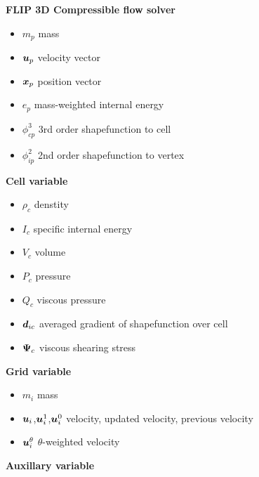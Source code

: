 \documentclass[11pt]{article}
\def\bbf#1{\mathchoice{\hbox{\boldmath$\displaystyle#1$}}
{\hbox{\boldmath$\textstyle#1$}} {\hbox{\boldmath$\scriptstyle#1$}} {\hbox{\boldmath$\scriptscriptstyle#1$}} }
\renewcommand{\mp}{m_{p}}
\newcommand{\pcp}{\phi_{cp}^3}
\newcommand{\pip}{\phi_{ip}^2}
\newcommand{\ui}{\bbf{u}_i}
\newcommand{\uiz}{\bbf{u}_i^{0}}
\newcommand{\uio}{\bbf{u}_i^{1}}
\newcommand{\uit}{\bbf{u}_i^{\theta}}
\newcommand{\up}{\bbf{u}_p}
\newcommand{\xp}{\bbf{x}_p}
\newcommand{\ep}{e_p}
\newcommand{\mi}{m_i}
\renewcommand{\mp}{m_p}
\newcommand{\rhoc}{\rho_c}
\newcommand{\Vc}{V_c}
\newcommand{\ic}{I_c}
\newcommand{\pc}{P_c}
\newcommand{\qc}{Q_c}
\newcommand{\psic}{\bbf{\Psi}_c}
\newcommand{\dic}{\bbf{d}_{ic}}
\begin{document}

\begin{center}
{\bf\Large FLIP 3D Compressible flow solver}
\end{center}

\begin{itemize}
	\item $\mp$ mass
	\item $\up$ velocity vector
	\item $\xp$ position vector
	\item $\ep$ mass-weighted internal energy
	\item $\pcp$ 3rd order shapefunction to cell
	\item $\pip$ 2nd order shapefunction to vertex
\end{itemize}
{\large \bf Cell variable} %
\begin{itemize}
	\item $\rhoc$ denstity
	\item $\ic$ specific internal energy
	\item $\Vc$ volume
	\item $\pc$ pressure
	\item $\qc$ viscous pressure
	\item $\dic$ averaged gradient of shapefunction over cell
	\item $\psic$ viscous shearing stress
\end{itemize}
{\large \bf Grid variable} %
\begin{itemize}
	\item $\mi$ mass
	\item $\ui$,$\uio$,$\uiz$ velocity, updated velocity, previous velocity
	\item $\uit$ $\theta$-weighted velocity
\end{itemize}
{\large \bf Auxillary variable} %
\end{document}
